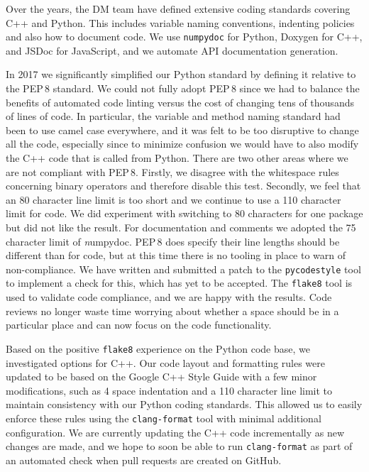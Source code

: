 Over the years, the DM team have defined extensive coding standards\cite{devguide} covering C++ and Python.
This includes variable naming conventions, indenting policies and also how to document code.
We use \texttt{numpydoc}\cite{numpydoc} for Python, Doxygen\cite{doxygen} for C++, and JSDoc\cite{jsdoc} for JavaScript, and we automate API documentation generation.

In 2017 we significantly simplified our Python standard by defining it relative to the PEP\,8 standard\cite{pep8}.
We could not fully adopt PEP\,8 since we had to balance the benefits of automated code linting versus the cost of changing tens of thousands of lines of code.
In particular, the variable and method naming standard had been to use camel case everywhere, and it was felt to be too disruptive to change all the code, especially since to minimize confusion we would have to also modify the C++ code that is called from Python.
There are two other areas where we are not compliant with PEP\,8.
Firstly, we disagree with the whitespace rules concerning binary operators and therefore disable this test.
Secondly, we feel that an 80 character line limit is too short and we continue to use a 110 character limit for code.
We did experiment with switching to 80 characters for one package but did not like the result.
For documentation and comments we  adopted the 75  character limit of {\emph numpydoc}.
PEP\,8 does specify their line lengths should be different than for code, but at this time there is no tooling in place to warn of non-compliance.
We have written and submitted a patch to the \texttt{pycodestyle} tool to implement a check for this, which has yet to be  accepted.
The \texttt{flake8} tool is used to validate code compliance, and we are happy with the results.
Code reviews no longer waste time worrying about whether a space should be in a particular place and can now focus on the code functionality.

Based on the positive  \texttt{flake8} experience on the Python code base, we investigated options for C++.
Our code layout and formatting rules were updated to be based on the Google C++ Style Guide\cite{googlestyle} with a few minor modifications, such as 4 space indentation and a 110 character line limit to maintain consistency with our Python coding standards.
This allowed us to easily enforce these rules using the \texttt{clang-format}\cite{clangformat} tool with minimal additional configuration.
We are currently updating the C++ code incrementally as new changes are made, and we hope to soon be able to run \texttt{clang-format} as part of an automated check when pull requests are created on GitHub.

